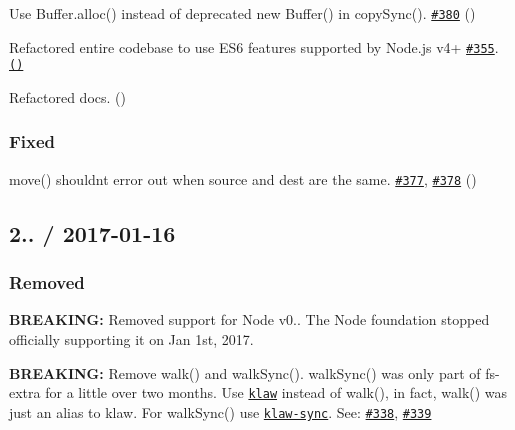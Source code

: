 \begin{DoxyItemize}
\item Use {\ttfamily Buffer.\+alloc()} instead of deprecated {\ttfamily new Buffer()} in {\ttfamily copy\+Sync()}. \href{https://github.com/jprichardson/node-fs-extra/pull/380}{\tt \#380} (\href{https://github.com/manidlou}{\tt })
\item Refactored entire codebase to use E\+S6 features supported by Node.\+js v4+ \href{https://github.com/jprichardson/node-fs-extra/issues/355}{\tt \#355}. \href{https://github.com/JPeer264}{\tt ()}
\item Refactored docs. (\href{https://github.com/manidlou}{\tt })
\end{DoxyItemize}

\subsubsection*{Fixed}


\begin{DoxyItemize}
\item {\ttfamily move()} shouldn\textquotesingle{}t error out when source and dest are the same. \href{https://github.com/jprichardson/node-fs-extra/issues/377}{\tt \#377}, \href{https://github.com/jprichardson/node-fs-extra/pull/378}{\tt \#378} (\href{https://github.com/jdalton}{\tt })
\end{DoxyItemize}

\subsection*{2.. / 2017-\/01-\/16 }

\subsubsection*{Removed}


\begin{DoxyItemize}
\item {\bfseries B\+R\+E\+A\+K\+I\+NG\+:} Removed support for Node {\ttfamily v0.}. The Node foundation stopped officially supporting it on Jan 1st, 2017.
\item {\bfseries B\+R\+E\+A\+K\+I\+NG\+:} Remove {\ttfamily walk()} and {\ttfamily walk\+Sync()}. {\ttfamily walk\+Sync()} was only part of {\ttfamily fs-\/extra} for a little over two months. Use \href{https://github.com/jprichardson/node-klaw}{\tt klaw} instead of {\ttfamily walk()}, in fact, {\ttfamily walk()} was just an alias to klaw. For {\ttfamily walk\+Sync()} use \href{https://github.com/mawni/node-klaw-sync}{\tt klaw-\/sync}. See\+: \href{https://github.com/jprichardson/node-fs-extra/issues/338}{\tt \#338}, \href{https://github.com/jprichardson/node-fs-extra/pull/339}{\tt \#339}
\end{DoxyItemize}

